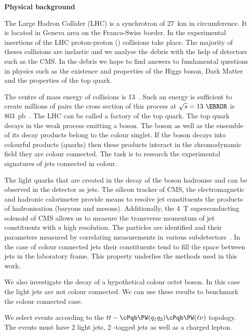\vskip 1.5cm
\medskip
\textbf{Physical background}
\nopagebreak\medskip

The Large Hadron Collider (LHC) is a synchrotron of 27~km in circumference. It is located in Geneva area on the Franco-Swiss border. In the experimental insertions of the LHC proton-proton (\Pp\Pp) collisions take place. The majority of theses collisions are inelastic and we analyse the debris with the help of detectors such as the CMS. In the debris we hope to find answers to fundamental questions in physics such as the existence and properties of the Higgs boson, Dark Matter and the properties of the top quark.

The centre of mass energy of \Pp\Pp collisions is 13~\TeV. Such an energy is sufficient to create millions of \ttbar pairs \textendash the cross section of this process at $\sqrt{s}=13~\TeV$ is 803~pb~\cite{Sirunyan:2018goh}. The LHC can be called a factory of the top quark. The top quark decays in the weak process emitting a \PW boson. The \PW boson as well as the ensemble of its decay products belong to the colour singlet. If the \PW boson decays into colourful products (quarks) then these products interact in the chromodynamic field \textendash they are colour connected. The task is to research the experimental signatures of jets connected in colour.

The light quarks that are created in the decay of the \PW boson hadronise and can be observed in the detector as jets. The silicon tracker of CMS, the electromagnetic and hadronic calorimeter provide means to resolve jet constituents \textendash the products of hadronisation (baryons and mesons). Additionally, the 4~T superconducting solenoid of CMS allows us to measure the transverse momentum of jet constituents with a high resolution. The particles are identified and their parameters measured by correlating measurements in various subdetectors~\cite{Sirunyan:2017ulk}. In the case of colour connected jets their constituents tend to fill the space between jets in the laboratory frame. This property underlies the methods used in this work. 

We also investigate the decay of a hypothetical colour octet \PW boson. In this case the light jets are not colour connected. We can use these results to benchmark the colour connected case.

We select events according to the $tt-\cPqb\PW(q_1q_2)\cPqb\PW(\ell\nu)$ topology. The events must have 2 light jets, 2 \cPqb-tagged jets as well as a charged lepton.

